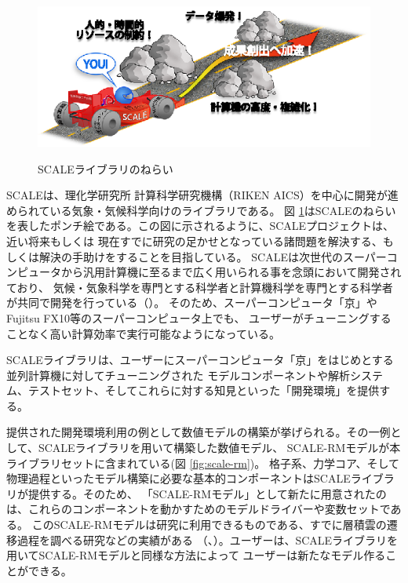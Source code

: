 \begin{figure}[bh]
\begin{center}
  \includegraphics[width=0.9\hsize]{./figure/library.eps}\\
  \caption{SCALEライブラリのねらい}
  \label{fig:scale}
\end{center}
\end{figure}

SCALEは、理化学研究所 計算科学研究機構（RIKEN AICS）を中心に開発が進められている気象・気候科学向けのライブラリである。
図 \ref{fig:scale}はSCALEのねらいを表したポンチ絵である。この図に示されるように、SCALEプロジェクトは、近い将来もしくは
現在すでに研究の足かせとなっている諸問題を解決する、もしくは解決の手助けをすることを目指している。
SCALEは次世代のスーパーコンピュータから汎用計算機に至るまで広く用いられる事を念頭において開発されており、
気候・気象科学を専門とする科学者と計算機科学を専門とする科学者が共同で開発を行っている（\cite{abe_etal_2013}）。
そのため、スーパーコンピュータ「京」やFujitsu FX10等のスーパーコンピュータ上でも、
ユーザーがチューニングすることなく高い計算効率で実行可能なようになっている。

SCALEライブラリは、ユーザーにスーパーコンピュータ「京」をはじめとする並列計算機に対してチューニングされた
モデルコンポーネントや解析システム、テストセット、そしてこれらに対する知見といった「開発環境」を提供する。

提供された開発環境利用の例として数値モデルの構築が挙げられる。その一例として、SCALEライブラリを用いて構築した数値モデル、
SCALE-RMモデルが本ライブラリセットに含まれている(図 \ref{fig:scale-rm})。
格子系、力学コア、そして物理過程といったモデル構築に必要な基本的コンポーネントはSCALEライブラリが提供する。そのため、
「SCALE-RMモデル」として新たに用意されたのは、これらのコンポーネントを動かすためのモデルドライバーや変数セットである。
このSCALE-RMモデルは研究に利用できるものである、すでに層積雲の遷移過程を調べる研究などの実績がある
（\cite{satoy_2014}、\cite{satoy_2015}）。ユーザーは、SCALEライブラリを用いてSCALE-RMモデルと同様な方法によって
ユーザーは新たなモデル作ることができる。


